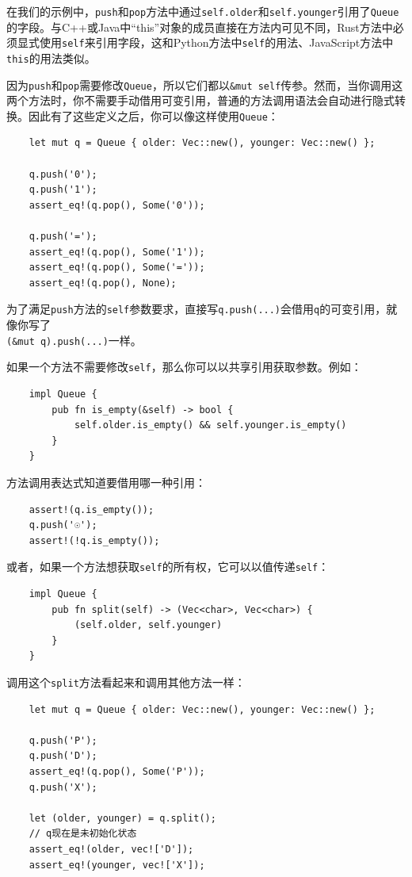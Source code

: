 在我们的示例中，\texttt{push}和\texttt{pop}方法中通过\texttt{self.older}和\texttt{self.younger}引用了\texttt{Queue}的字段。与C++或Java中“this”对象的成员直接在方法内可见不同，Rust方法中必须显式使用\texttt{self}来引用字段，这和Python方法中\texttt{self}的用法、JavaScript方法中\texttt{this}的用法类似。

因为\texttt{push}和\texttt{pop}需要修改\texttt{Queue}，所以它们都以\texttt{\&mut self}传参。然而，当你调用这两个方法时，你不需要手动借用可变引用，普通的方法调用语法会自动进行隐式转换。因此有了这些定义之后，你可以像这样使用\texttt{Queue}：
\begin{verbatim}
    let mut q = Queue { older: Vec::new(), younger: Vec::new() };

    q.push('0');
    q.push('1');
    assert_eq!(q.pop(), Some('0'));

    q.push('=');
    assert_eq!(q.pop(), Some('1'));
    assert_eq!(q.pop(), Some('='));
    assert_eq!(q.pop(), None);
\end{verbatim}

为了满足\texttt{push}方法的\texttt{self}参数要求，直接写\texttt{q.push(...)}会借用\texttt{q}的可变引用，就像你写了\\
\texttt{(\&mut q).push(...)}一样。

如果一个方法不需要修改\texttt{self}，那么你可以以共享引用获取参数。例如：
\begin{verbatim}
    impl Queue {
        pub fn is_empty(&self) -> bool {
            self.older.is_empty() && self.younger.is_empty()
        }
    }
\end{verbatim}

方法调用表达式知道要借用哪一种引用：
\begin{verbatim}
    assert!(q.is_empty());
    q.push('☉');
    assert!(!q.is_empty());
\end{verbatim}

或者，如果一个方法想获取\texttt{self}的所有权，它可以以值传递\texttt{self}：
\begin{verbatim}
    impl Queue {
        pub fn split(self) -> (Vec<char>, Vec<char>) {
            (self.older, self.younger)
        }
    }
\end{verbatim}

调用这个\texttt{split}方法看起来和调用其他方法一样：
\begin{verbatim}
    let mut q = Queue { older: Vec::new(), younger: Vec::new() };

    q.push('P');
    q.push('D');
    assert_eq!(q.pop(), Some('P'));
    q.push('X');

    let (older, younger) = q.split();
    // q现在是未初始化状态
    assert_eq!(older, vec!['D']);
    assert_eq!(younger, vec!['X']);
\end{verbatim}

